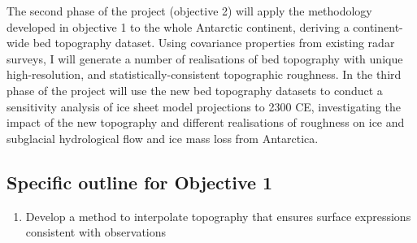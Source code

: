 The second phase of the project (objective 2) will apply the methodology developed in objective 1 to the whole Antarctic continent, deriving a continent-wide bed topography dataset. Using covariance properties from existing radar surveys, I will generate a number of realisations of bed topography with unique high-resolution, and statistically-consistent topographic roughness. In the third phase of the project will use the new bed topography datasets to conduct a sensitivity analysis of ice sheet model projections to 2300 CE, investigating the impact of the new topography and different realisations of roughness on ice and subglacial hydrological flow and ice mass loss from Antarctica.

\subsection*{Specific outline for Objective 1}
\begin{enumerate}
\item Develop a method to interpolate topography that ensures surface expressions consistent with observations
\end{enumerate}


